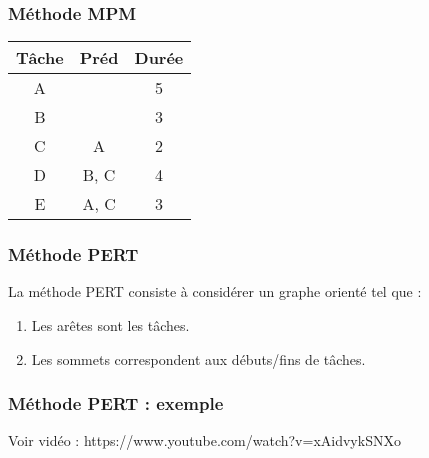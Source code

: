 \documentclass[draft]{beamer}
\begin{document}
\begin{frame}[fragile]
    \frametitle{Méthode MPM}
    \begin{table}[]
        \begin{tabular}{|c|c|c|}
            \hline
            Tâche & Préd & Durée \\ \hline
            A     &      & 5     \\ \hline
            B     &      & 3     \\ \hline
            C     & A    & 2     \\ \hline
            D     & B, C & 4     \\ \hline
            E     & A, C & 3     \\ \hline
        \end{tabular}
    \end{table}
    \begin{figure}
    \end{figure}
\end{frame}

\begin{frame}[fragile]
    \frametitle{Méthode PERT}
    La méthode PERT consiste à considérer un graphe orienté tel que :
    \begin{enumerate}
        \item Les arêtes sont les tâches.
        \item Les sommets correspondent aux débuts/fins de tâches.
    \end{enumerate}
\end{frame}

\begin{frame}
    \frametitle{Méthode PERT : exemple}
    Voir vidéo : https://www.youtube.com/watch?v=xAidvykSNXo
\end{frame}
\end{document}
